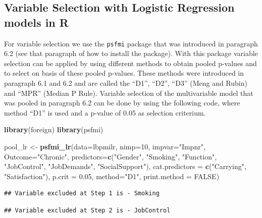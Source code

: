 \documentclass[
]{book}
\newenvironment{Shaded}{\begin{snugshade}}{\end{snugshade}}
\newcommand{\DataTypeTok}[1]{\textcolor[rgb]{0.13,0.29,0.53}{#1}}
\newcommand{\DecValTok}[1]{\textcolor[rgb]{0.00,0.00,0.81}{#1}}
\newcommand{\FloatTok}[1]{\textcolor[rgb]{0.00,0.00,0.81}{#1}}
\newcommand{\KeywordTok}[1]{\textcolor[rgb]{0.13,0.29,0.53}{\textbf{#1}}}
\newcommand{\NormalTok}[1]{#1}
\newcommand{\OtherTok}[1]{\textcolor[rgb]{0.56,0.35,0.01}{#1}}
\newcommand{\StringTok}[1]{\textcolor[rgb]{0.31,0.60,0.02}{#1}}
\begin{document}
\hypertarget{variable-selection-with-logistic-regression-models-in-r}{%
\subsection{Variable Selection with Logistic Regression models in
R}\label{variable-selection-with-logistic-regression-models-in-r}}

For variable selection we use the \texttt{psfmi} package that was
introduced in paragraph 6.2 (see that paragraph of how to install the
package). With this package variable selection can be applied by using
different methods to obtain pooled p-values and to select on basis of
these pooled p-values. These methods were introduced in paragraph 6.1
and 6.2 and are called the ``D1'', ``D2'', ``D3'' (Meng and Rubin) and
``MPR'' (Median P Rule). Variable selection of the multivariable model
that was pooled in paragraph 6.2 can be done by using the following
code, where method ``D1'' is used and a p-value of 0.05 as selection
criterium.

\begin{Shaded}
\begin{Highlighting}[]
\KeywordTok{library}\NormalTok{(foreign)}
\KeywordTok{library}\NormalTok{(psfmi)}

\NormalTok{pool_lr <-}\StringTok{ }\KeywordTok{psfmi_lr}\NormalTok{(}\DataTypeTok{data=}\NormalTok{lbpmilr, }\DataTypeTok{nimp=}\DecValTok{10}\NormalTok{, }\DataTypeTok{impvar=}\StringTok{"Impnr"}\NormalTok{, }\DataTypeTok{Outcome=}\StringTok{"Chronic"}\NormalTok{,}
  \DataTypeTok{predictors=}\KeywordTok{c}\NormalTok{(}\StringTok{"Gender"}\NormalTok{, }\StringTok{"Smoking"}\NormalTok{, }\StringTok{"Function"}\NormalTok{, }\StringTok{"JobControl"}\NormalTok{, }\StringTok{"JobDemands"}\NormalTok{,}
  \StringTok{"SocialSupport"}\NormalTok{), }\DataTypeTok{cat.predictors =} \KeywordTok{c}\NormalTok{(}\StringTok{"Carrying"}\NormalTok{, }\StringTok{"Satisfaction"}\NormalTok{), }
  \DataTypeTok{p.crit =} \FloatTok{0.05}\NormalTok{, }\DataTypeTok{method=}\StringTok{"D1"}\NormalTok{, }\DataTypeTok{print.method =} \OtherTok{FALSE}\NormalTok{)}
\end{Highlighting}
\end{Shaded}

\begin{verbatim}
## Variable excluded at Step 1 is - Smoking
\end{verbatim}

\begin{verbatim}
## Variable excluded at Step 2 is - JobControl
\end{verbatim}
\end{document}
